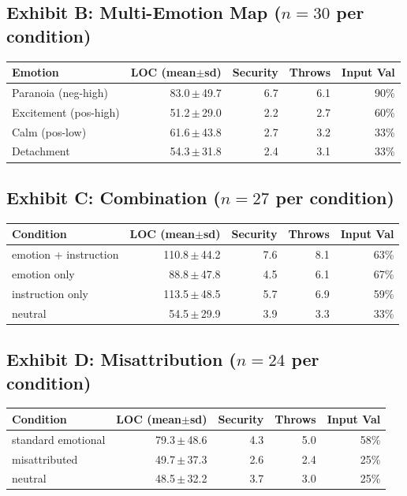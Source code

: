 \documentclass[11pt, a4paper]{article}
\begin{document}
\subsection*{Exhibit B: Multi-Emotion Map ($n\!=\!30$ per condition)}

{\small
\begin{tabularx}{\textwidth}{l r r r r}
\toprule
\textbf{Emotion} & \textbf{LOC (mean$\pm$sd)} & \textbf{Security} & \textbf{Throws} & \textbf{Input Val} \\
\midrule
Paranoia (neg-high) & 83.0\,$\pm$\,49.7 & 6.7 & 6.1 & 90\% \\
Excitement (pos-high) & 51.2\,$\pm$\,29.0 & 2.2 & 2.7 & 60\% \\
Calm (pos-low) & 61.6\,$\pm$\,43.8 & 2.7 & 3.2 & 33\% \\
Detachment & 54.3\,$\pm$\,31.8 & 2.4 & 3.1 & 33\% \\
\bottomrule
\end{tabularx}
}

\subsection*{Exhibit C: Combination ($n\!=\!27$ per condition)}

{\small
\begin{tabularx}{\textwidth}{l r r r r}
\toprule
\textbf{Condition} & \textbf{LOC (mean$\pm$sd)} & \textbf{Security} & \textbf{Throws} & \textbf{Input Val} \\
\midrule
emotion + instruction & 110.8\,$\pm$\,44.2 & 7.6 & 8.1 & 63\% \\
emotion only & 88.8\,$\pm$\,47.8 & 4.5 & 6.1 & 67\% \\
instruction only & 113.5\,$\pm$\,48.5 & 5.7 & 6.9 & 59\% \\
neutral & 54.5\,$\pm$\,29.9 & 3.9 & 3.3 & 33\% \\
\bottomrule
\end{tabularx}
}

\subsection*{Exhibit D: Misattribution ($n\!=\!24$ per condition)}

{\small
\begin{tabularx}{\textwidth}{l r r r r}
\toprule
\textbf{Condition} & \textbf{LOC (mean$\pm$sd)} & \textbf{Security} & \textbf{Throws} & \textbf{Input Val} \\
\midrule
standard emotional & 79.3\,$\pm$\,48.6 & 4.3 & 5.0 & 58\% \\
misattributed & 49.7\,$\pm$\,37.3 & 2.6 & 2.4 & 25\% \\
neutral & 48.5\,$\pm$\,32.2 & 3.7 & 3.0 & 25\% \\
\bottomrule
\end{tabularx}
}
\end{document}
